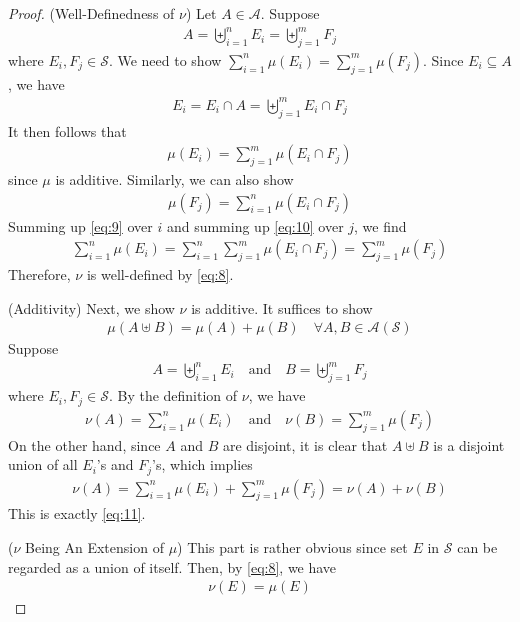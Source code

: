 \documentclass[thmcnt=section, 12pt, color=purple]{my-elegantbook}
\begin{document}
\begin{proof}
	(Well-Definedness of $\nu$) Let $A \in \mathcal{A}$.
	Suppose
	\begin{align*}
		A = \biguplus_{i=1}^n E_i = \biguplus_{j=1}^m F_j
	\end{align*}
	where $E_i, F_j \in \mathcal{S}$.
	We need to show $\sum_{i=1}^n \mu(E_i) = \sum_{j=1}^m \mu(F_j)$.
	Since $E_i \subseteq A$, we have
	\begin{align*}
		E_i = E_i \cap A = \biguplus_{j=1}^m E_i \cap F_j
	\end{align*}
	It then follows that 
	\begin{align}
		\mu(E_i) = \sum_{j=1}^m \mu(E_i \cap F_j)
		\label{eq:9}
	\end{align}
	since $\mu$ is additive.
	Similarly, we can also show 
	\begin{align}
		\mu(F_j) = \sum_{i=1}^n \mu(E_i \cap F_j)
		\label{eq:10}
	\end{align}
	Summing up \eqref{eq:9} over $i$
	and summing up \eqref{eq:10} over $j$,
	we find 
	\begin{align*}
		\sum_{i=1}^n \mu(E_i) 
		= \sum_{i=1}^n \sum_{j=1}^m \mu(E_i \cap F_j)
		= \sum_{j=1}^m \mu(F_j)
	\end{align*}
	Therefore, $\nu$ is well-defined by \eqref{eq:8}.

	(Additivity) Next, we show $\nu$ is additive.
	It suffices to show 
	\begin{align}
		\mu(A \uplus B) = \mu(A) + \mu(B)
		\quad 
		\forall A, B \in \mathcal{A}(\mathcal{S})
		\label{eq:11}
	\end{align}
	Suppose
	\begin{align*}
		A = \biguplus_{i=1}^n E_i
		\quad \text{and} \quad
		B = \biguplus_{j=1}^m F_j
	\end{align*}
	where $E_i, F_j \in \mathcal{S}$.
	By the definition of $\nu$, we have 
	\begin{align*}
		\nu(A) = \sum_{i=1}^n \mu(E_i)
		\quad \text{and} \quad 
		\nu(B) = \sum_{j=1}^m \mu(F_j)
	\end{align*}
	On the other hand, since $A$ and $B$
	are disjoint, it is clear
	that $A \uplus B$
	is a disjoint union of all $E_i$'s and $F_j$'s,
	which implies
	\begin{align*}
		\nu(A) = \sum_{i=1}^n \mu(E_i) + \sum_{j=1}^m \mu(F_j)
		= \nu(A) + \nu(B)
	\end{align*}
	This is exactly \eqref{eq:11}.

	($\nu$ Being An Extension of $\mu$) 
	This part is rather obvious since set $E$
	in $\mathcal{S}$ can be regarded as a union of itself.
	Then, by \eqref{eq:8},
	we have 
	\begin{align*}
		\nu(E) = \mu(E)
	\end{align*}


\end{proof}
\end{document}
